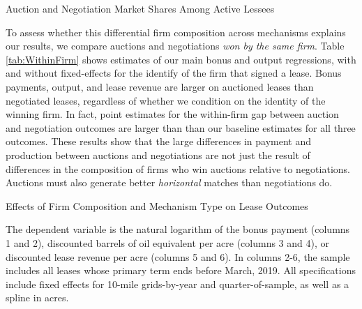 \begin{table}[htpb]
\begin{center}
\begin{threeparttable}
\caption{Auction and Negotiation Market Shares Among Active Lessees}
\label{tab:table_allocative}
 	\small
   	            
\end{threeparttable}
\end{center}
\end{table}

To assess whether this differential firm composition across mechanisms explains our results, we compare auctions and negotiations \textit{won by the same firm}.  Table \ref{tab:WithinFirm} shows estimates of our main bonus and output regressions, with and without fixed-effects for the identify of the firm that signed a lease.  Bonus payments, output, and lease revenue are larger on auctioned leases than negotiated leases, regardless of whether we condition on the identity of the winning firm.  In fact, point estimates for the within-firm gap between auction and negotiation outcomes are larger than than our baseline estimates for all three outcomes.  These results show that the large differences in payment and production between auctions and negotiations are not just the result of differences in the composition of firms who win auctions relative to negotiations. Auctions must also generate better \textit{horizontal} matches than negotiations do.  

\begin{table}[htpb]
	\begin{center}
	\begin{threeparttable}
	\caption{Effects of Firm Composition and Mechanism Type on Lease Outcomes}
	\label{tab:WithinFirm}
	\small
	    
		\begin{tablenotes}
			\footnotesize
			\item The dependent variable is the natural logarithm of the bonus payment (columns 1 and 2), discounted barrels of oil equivalent per acre (columns 3 and 4), or discounted lease revenue per acre (columns 5 and 6).  In columns 2-6, the sample includes all leases whose primary term ends before March, 2019.  All specifications include fixed effects for 10-mile grids-by-year and quarter-of-sample, as well as a spline in acres.   
			\end{tablenotes}        
	\end{threeparttable}
	\end{center}
\end{table}

